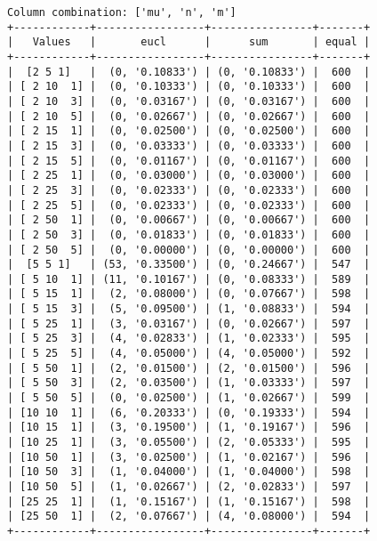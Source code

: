 \documentclass{article}
\begin{document}
\begin{verbatim}
Column combination: ['mu', 'n', 'm']
+------------+-----------------+----------------+-------+
|   Values   |       eucl      |      sum       | equal |
+------------+-----------------+----------------+-------+
|  [2 5 1]   |  (0, '0.10833') | (0, '0.10833') |  600  |
| [ 2 10  1] |  (0, '0.10333') | (0, '0.10333') |  600  |
| [ 2 10  3] |  (0, '0.03167') | (0, '0.03167') |  600  |
| [ 2 10  5] |  (0, '0.02667') | (0, '0.02667') |  600  |
| [ 2 15  1] |  (0, '0.02500') | (0, '0.02500') |  600  |
| [ 2 15  3] |  (0, '0.03333') | (0, '0.03333') |  600  |
| [ 2 15  5] |  (0, '0.01167') | (0, '0.01167') |  600  |
| [ 2 25  1] |  (0, '0.03000') | (0, '0.03000') |  600  |
| [ 2 25  3] |  (0, '0.02333') | (0, '0.02333') |  600  |
| [ 2 25  5] |  (0, '0.02333') | (0, '0.02333') |  600  |
| [ 2 50  1] |  (0, '0.00667') | (0, '0.00667') |  600  |
| [ 2 50  3] |  (0, '0.01833') | (0, '0.01833') |  600  |
| [ 2 50  5] |  (0, '0.00000') | (0, '0.00000') |  600  |
|  [5 5 1]   | (53, '0.33500') | (0, '0.24667') |  547  |
| [ 5 10  1] | (11, '0.10167') | (0, '0.08333') |  589  |
| [ 5 15  1] |  (2, '0.08000') | (0, '0.07667') |  598  |
| [ 5 15  3] |  (5, '0.09500') | (1, '0.08833') |  594  |
| [ 5 25  1] |  (3, '0.03167') | (0, '0.02667') |  597  |
| [ 5 25  3] |  (4, '0.02833') | (1, '0.02333') |  595  |
| [ 5 25  5] |  (4, '0.05000') | (4, '0.05000') |  592  |
| [ 5 50  1] |  (2, '0.01500') | (2, '0.01500') |  596  |
| [ 5 50  3] |  (2, '0.03500') | (1, '0.03333') |  597  |
| [ 5 50  5] |  (0, '0.02500') | (1, '0.02667') |  599  |
| [10 10  1] |  (6, '0.20333') | (0, '0.19333') |  594  |
| [10 15  1] |  (3, '0.19500') | (1, '0.19167') |  596  |
| [10 25  1] |  (3, '0.05500') | (2, '0.05333') |  595  |
| [10 50  1] |  (3, '0.02500') | (1, '0.02167') |  596  |
| [10 50  3] |  (1, '0.04000') | (1, '0.04000') |  598  |
| [10 50  5] |  (1, '0.02667') | (2, '0.02833') |  597  |
| [25 25  1] |  (1, '0.15167') | (1, '0.15167') |  598  |
| [25 50  1] |  (2, '0.07667') | (4, '0.08000') |  594  |
+------------+-----------------+----------------+-------+
\end{verbatim}
\end{document}
